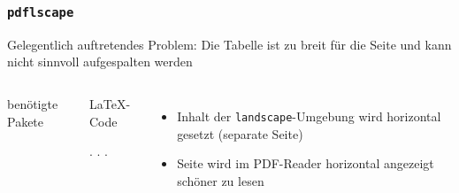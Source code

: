 \begin{frame}[fragile]
  \frametitle{\texttt{pdflscape}}
  Gelegentlich auftretendes Problem: Die Tabelle ist zu breit für die Seite und kann nicht sinnvoll aufgespalten werden
  \begin{columns}[T]
    \begin{block}{benötigte Pakete}
      \begin{lstverbatim}
      \end{lstverbatim}
    \end{block}
    \begin{block}{\LaTeX-Code}
      \begin{lstverbatim}
      \begin{landscape}
          \begin{table}
            . . .
          \end{table}
      \end{landscape}
      \end{lstverbatim}
    \end{block}
    \begin{itemize}
      \item Inhalt der \texttt{landscape}-Umgebung wird horizontal gesetzt (separate Seite)
      \item Seite wird im PDF-Reader horizontal angezeigt \mbox{\rightarrow} schöner zu lesen
    \end{itemize}
  \end{columns}
\end{frame}
